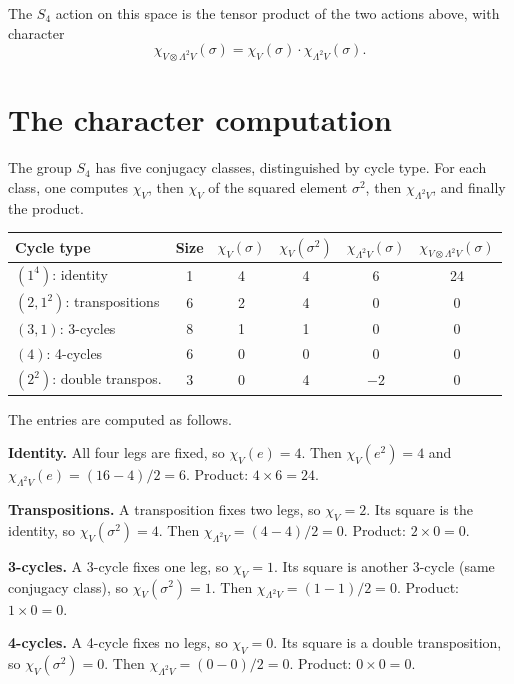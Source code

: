 \documentclass[11pt]{article}
\begin{document}
The $S_4$ action on this space is the tensor
product of the two actions above, with character
\[
        \chi_{V\otimes\Lambda^2V}(\sigma)
        = \chi_V(\sigma)\cdot\chi_{\Lambda^2V}(\sigma).
\]


\section{The character computation}

The group $S_4$ has five conjugacy classes, distinguished by cycle
type.  For each class, one computes $\chi_V$, then $\chi_V$ of the
squared element $\sigma^2$, then $\chi_{\Lambda^2V}$, and finally
the product.

\begin{center}
\begin{tabular}{lccccc}
\toprule
Cycle type & Size & $\chi_V(\sigma)$ & $\chi_V(\sigma^2)$
           & $\chi_{\Lambda^2V}(\sigma)$
           & $\chi_{V\otimes\Lambda^2V}(\sigma)$ \\
\midrule
$(1^4)$: identity         & 1  & 4 & 4 & 6  & 24 \\
$(2,1^2)$: transpositions & 6  & 2 & 4 & 0  & 0  \\
$(3,1)$: 3-cycles         & 8  & 1 & 1 & 0  & 0  \\
$(4)$: 4-cycles           & 6  & 0 & 0 & 0  & 0  \\
$(2^2)$: double transpos. & 3  & 0 & 4 & $-2$ & 0  \\
\bottomrule
\end{tabular}
\end{center}

The entries are computed as follows.

\textbf{Identity.}  All four legs are fixed, so $\chi_V(e)=4$.
Then $\chi_V(e^2)=4$ and $\chi_{\Lambda^2V}(e)=(16-4)/2=6$.
Product: $4\times 6=24$.

\textbf{Transpositions.}  A transposition fixes two legs,
so $\chi_V=2$.  Its square is the identity, so $\chi_V(\sigma^2)=4$.
Then $\chi_{\Lambda^2V}=(4-4)/2=0$.  Product: $2\times 0=0$.

\textbf{3-cycles.}  A 3-cycle fixes one leg, so $\chi_V=1$.
Its square is another 3-cycle (same conjugacy class), so
$\chi_V(\sigma^2)=1$.  Then $\chi_{\Lambda^2V}=(1-1)/2=0$.
Product: $1\times 0=0$.

\textbf{4-cycles.}  A 4-cycle fixes no legs, so $\chi_V=0$.
Its square is a double transposition, so $\chi_V(\sigma^2)=0$.
Then $\chi_{\Lambda^2V}=(0-0)/2=0$.  Product: $0\times 0=0$.
\end{document}
